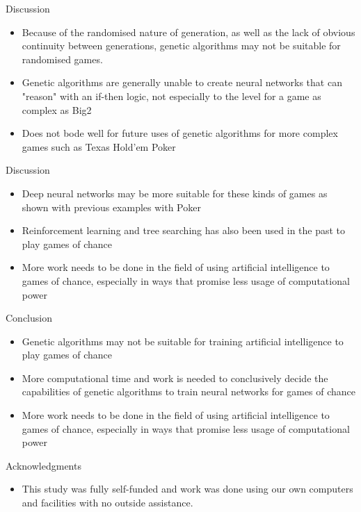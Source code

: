 \documentclass{beamer}
\begin{document}
\begin{frame}{Discussion}
	\begin{itemize}
		\item Because of the randomised nature of generation, as well as the lack of obvious continuity between generations, genetic algorithms may not be suitable for randomised games.
		\item Genetic algorithms are generally unable to create neural networks that can "reason" with an if-then logic, not especially to the level for a game as complex as Big2
		\item Does not bode well for future uses of genetic algorithms for more complex games such as Texas Hold'em Poker
	\end{itemize}
\end{frame}

\begin{frame}{Discussion}
	\begin{itemize}
		\item Deep neural networks may be more suitable for these kinds of games as shown with previous examples with Poker \cite{pokerai}
		\item Reinforcement learning and tree searching has also been used in the past to play games of chance \cite{big2aitree}
		\item More work needs to be done in the field of using artificial intelligence to games of chance, especially in ways that promise less usage of computational power
	\end{itemize}
\end{frame}

\begin{frame}{Conclusion}
	\begin{itemize}
		\item Genetic algorithms may not be suitable for training artificial intelligence to play games of chance
		\item More computational time and work is needed to conclusively decide the capabilities of genetic algorithms to train neural networks for games of chance
		\item More work needs to be done in the field of using artificial intelligence to games of chance, especially in ways that promise less usage of computational power
	\end{itemize}
\end{frame}

\begin{frame}{Acknowledgments}
	\begin{itemize}
		\item This study was fully self-funded and work was done using our own computers and facilities with no outside assistance.
	\end{itemize}
\end{frame}
\end{document}
